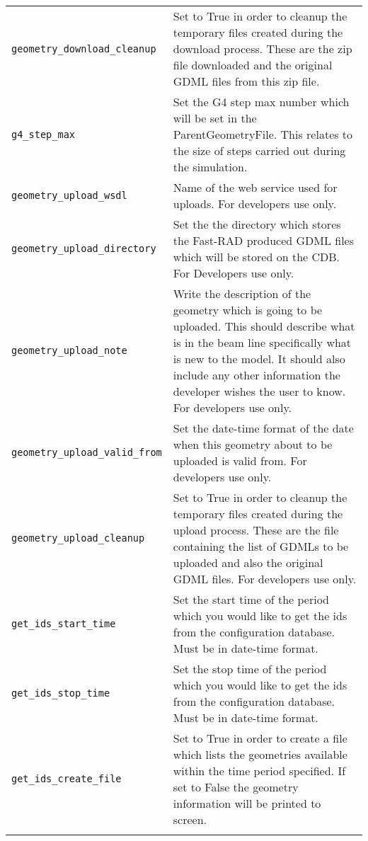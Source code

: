 \begin{table*}
\begin{center}
\begin{tabularx}{\textwidth}{lX}
\verb|geometry_download_cleanup| & Set to True in order to cleanup the temporary files created during the download process. These are the zip file
downloaded and the original GDML files from this zip file.\\
\verb|g4_step_max| & Set the G4 step max number which will be set in the ParentGeometryFile. This relates to the size of steps carried out during
the simulation.\\
\verb|geometry_upload_wsdl| & Name of the web service used for uploads. For developers use only.\\
\verb|geometry_upload_directory| & Set the the directory which stores the Fast-RAD produced GDML files which will be stored on the CDB. For Developers
use only.\\
\verb|geometry_upload_note| & Write the description of the geometry which is going to be uploaded. This should describe what is in the beam line
specifically what is new to the model. It should also include any other information the developer wishes the user to know. For developers use only.\\
\verb|geometry_upload_valid_from| & Set the date-time format of the date when this geometry about to be uploaded is valid from. For developers use
only.\\
\verb|geometry_upload_cleanup| & Set to True in order to cleanup the temporary files created during the upload process. These are the file
containing the list of GDMLs to be uploaded and also the original GDML files. For developers use only.\\
\verb|get_ids_start_time| & Set the start time of the period which you would like to get the ids from the configuration database. Must be in
date-time format.\\
\verb|get_ids_stop_time| & Set the stop time of the period which you would like to get the ids from the configuration database. Must be in
date-time format.\\
\verb|get_ids_create_file| & Set to True in order to create a file which lists the geometries available within the time period specified. If set to
False the geometry information will be printed to screen.\\
\begin{makeimage} %
\end{makeimage} 
\end{tabularx}
\end{center}
\end{table*}


